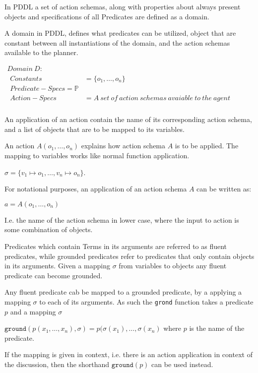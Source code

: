 \documentclass[../Master.tex]{subfiles}
\begin{document}
In PDDL a set of action schemas, along with properties about always present objects and specifications of all Predicates are defined as a domain.

\begin{definition} A domain in PDDL, defines what predicates can be utilized, object that are constant between all instantiations of the domain, and the action schemas available to the planner.
	
$
\begin{array}{ll}
Domain~D: & \\

\begin{array}{ll}
Constants & = \{o_1,\dots,o_n\}			 \\  
Predicate-Specs = \mathbb{P} \\
Action-Specs & = A~set~of~action~schemas~avaiable~to~the~agent \\
\end{array}
\end{array}$
\end{definition}


	

An application of an action contain the name of its corresponding action schema, and a list of objects that are to be mapped to its variables.
\begin{definition} 
	An action $A(o_1,\dots,o_n)$ explains how action schema $A$ is to be applied. The mapping to variables works like normal function application. 
	
	$\sigma = \{ v_1 \mapsto o_1,\dots,v_n \mapsto o_n \}$.
	
	For notational purposes, an application of an action schema $A$ can be written as:
	
	$a = A(o_1,\dots,o_n)$ 
	
	I.e. the name of the action schema in lower case, where the input to action is some combination of objects.
	
	
	
\end{definition}


Predicates which contain Terms in its arguments are referred to as fluent predicates, while grounded predicates refer to predicates that only contain objects in its arguments. Given a mapping $\sigma$ from variables to objects any fluent predicate can become grounded.
\begin{definition} 
	Any fluent predicate cab be mapped to a grounded predicate, by a applying a mapping $\sigma$ to each of its arguments. As such the \texttt{grond} function takes a predicate $p$ and a mapping $\sigma$
	
		$\texttt{ground}(p(x_1,\dots,x_n),\sigma) = p(\sigma(x_1),\dots,\sigma(x_n)$ where $p$ is the name of the predicate.
		
	If the mapping is given in context, i.e. there is an action application in context of the discussion, then the shorthand $\texttt{ground}(p)$ can be used instead.
\end{definition}
\end{document}
